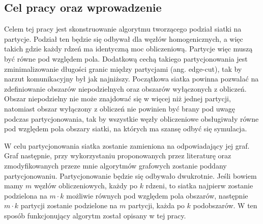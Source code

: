 \subsection{Cel pracy oraz wprowadzenie}
Celem tej pracy jest skonstruowanie algorytmu tworzącego podział siatki na partycje.
Podział ten będzie się odbywał dla węzłów homogenicznych, a więc takich gdzie każdy rdzeń ma identyczną moc obliczeniową.
Partycje więc muszą być równe pod względem pola.
Dodatkową cechą takiego partycjonowania jest zminimalizowanie długości granic między partycjami (ang. edge-cut),
tak by narzut komunikacyjny był jak najniższy.
Początkowa siatka powinna pozwalać na zdefiniowanie obszarów niepodzielnych oraz obszarów wyłączonych z obliczeń.
Obszar niepodzielny nie może znajdować się w więcej niż jednej partycji, natomiast
obszar wyłączony z obliczeń nie powinien być brany pod uwagę podczas partycjonowania, tak by wszystkie węzły obliczeniowe
obsługiwały równe pod względem pola obszary siatki, na których ma szansę odbyć się symulacja.

W celu partycjonowania siatka zostanie zamieniona na odpowiadający jej graf.
Graf następnie, przy wykorzystaniu proponowanych przez literaturę oraz zmodyfikowanych przeze mnie algorytmów grafowych
zostanie poddany partycjonowaniu.
Partycjonowanie będzie się odbywało dwukrotnie.
Jeśli bowiem mamy $m$ węzłów obliczeniowych, każdy po $k$ rdzeni, to siatka najpierw zostanie podzielona na
$m \cdot k$ możliwie równych pod względem pola obszarów, następnie $m \cdot k$ partycji zostanie podzielone
na $m$ partycji, każda po $k$ podobszarów.
W ten sposób funkcjonujący algorytm został opisany w tej pracy.